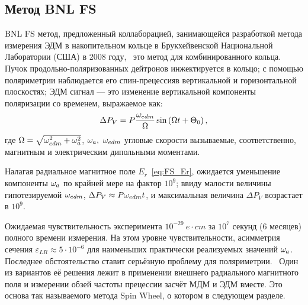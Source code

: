 \subsection{Метод BNL FS}
BNL FS метод, предложенный коллаборацией, занимающейся разработкой
метода измерения ЭДМ в накопительном кольце в Брукхейвенской
Национальной Лаборатории (США) в 2008 году,~\cite{BNL:Deuteron2008}
это метод для комбинированного кольца. Пучок продольно-поляризованных
дейтронов инжектируется в кольцо; с помощью поляриметрии наблюдается
его спин-прецессияв вертикальной и горизонтальной плоскостях; ЭДМ
сигнал --- это изменение вертикальной компоненты поляризации со
временем, выражаемое как:~\cite[стр.~8]{BNL:Deuteron2008}
\begin{equation}
  \Delta P_V = P\frac{\w_{edm}}{\W}\sin\bkt{\W t + \Theta_0},
\end{equation}
где $\Omega = \sqrt{\omega_{edm}^2 + \omega_a^2}$, $\omega_a,~\omega_{edm}$ угловые
скорости вызываемые, соответственно, магнитным и электрическим
дипольными моментами.

Налагая радиальное магнитное поле $E_r$~\eqref{eq:FS_Er}, ожидается
уменьшение компоненты $\omega_a$ по крайней мере на фактор $10^9$; ввиду
малости величины гипотезируемой $\omega_{edm}$, $\Delta P_V \approx P
\omega_{edm} t$, и максимальная величина $\Delta P_V$ возрастает в $10^9$.

Ожидаемая чувствительность эксперимента $10^{-29}~e\cdot cm$ за $10^7$
секунд (6 месяцев) полного времени измерения. На этом уровне
чувствительности, асимметрия сечения $\varepsilon_{LR} \approx 5\cdot
10^{-6}$ для наименьших практически реализуемых значений
$\omega_a$.~\cite[стр.~18]{BNL:Deuteron2008} Последнее обстоятельство
ставит серьёзную проблему для поляриметрии.~\cite{Mane:SpinWheel} Один
из вариантов её решения лежит в применении внешнего радиального
магнитного поля и измерении обзей частоты прецессии засчёт МДМ и ЭДМ
вместе. Это основа так называемого метода Spin Wheel, о котором в
следующем разделе.

